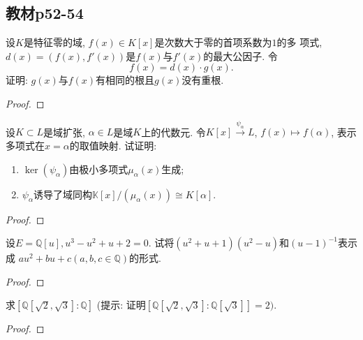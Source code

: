 \subsection{教材p52-54}

\begin{problem}
    设$K$是特征零的域, $f(x) \in K[x]$是次数大于零的首项系数为$1$的多
项式, $d(x) = (f(x), f'(x))$是$f(x)$与$f'(x)$的最大公因子. 令
\[
    f(x) = d(x) \cdot g(x).
\]
证明: $g(x)$与$f(x)$有相同的根且$g(x)$没有重根.
\end{problem}

\begin{proof}
    
\end{proof}

\begin{problem}
    设$K \subset L$是域扩张, $\alpha \in L$是域$K$上的代数元.
令$K[x] \xrightarrow{\psi_{\alpha}}L$,
$f(x) \mapsto f(\alpha)$, 表示多项式在$x = \alpha$的取值映射.
试证明: 
\begin{enumerate}[(1)]
    \item $\ker(\psi_\alpha)$由极小多项式$\mu_\alpha(x)$生成;
    \item $\psi_\alpha$诱导了域同构$\mathbb{K}[x]/(\mu_\alpha(x)) \cong K[\alpha]$.
\end{enumerate}
\end{problem}

\begin{proof}
    
\end{proof}

\begin{problem}
    设$E = \mathbb{Q}[u], u^3 - u^2 + u + 2 = 0$.
试将$(u^2 + u + 1)(u^2 - u)$和$(u - 1)^{-1}$表示成
$au^2 + bu + c (a, b, c \in \mathbb{Q})$的形式.
\end{problem}

\begin{proof}
    
\end{proof}

\begin{problem}
    求$[\mathbb{Q}[\sqrt2, \sqrt3]:\mathbb{Q}]$
(提示: 证明$\left[\mathbb{Q}[\sqrt2, \sqrt3]:\mathbb{Q}[\sqrt3]\right] = 2)$.
\end{problem}

\begin{proof}
    
\end{proof}

